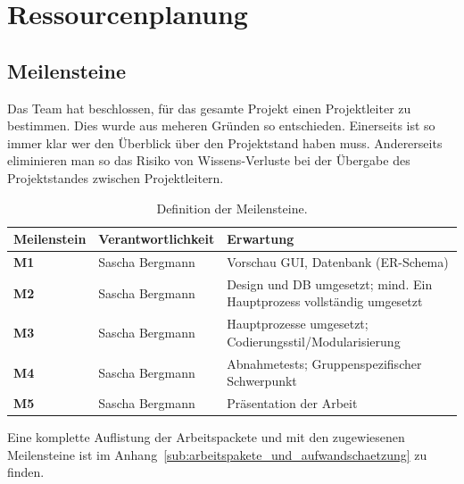 \section{Ressourcenplanung}
\subsection{Meilensteine}
Das Team hat beschlossen, für das gesamte Projekt einen Projektleiter zu bestimmen. Dies wurde aus meheren Gründen so entschieden.
Einerseits ist so immer klar wer den Überblick über den Projektstand haben muss. Andererseits eliminieren man so das Risiko von Wissens-Verluste bei der Übergabe des Projektstandes zwischen Projektleitern.\\

\begin{table}[H]
\centering
\begin{tabularx}{\textwidth-1cm}{|l|l|X|} \hline
\textbf{Meilenstein}	& \textbf{Verantwortlichkeit} &	\textbf{Erwartung} \\ \hline
\textbf{M1}	&Sascha Bergmann	&Vorschau GUI, Datenbank (ER-Schema) \\  \hline
\textbf{M2}	&Sascha Bergmann	&Design und DB umgesetzt; mind. Ein Hauptprozess vollständig umgesetzt \\ \hline
\textbf{M3}	&Sascha Bergmann	&Hauptprozesse umgesetzt; Codierungsstil/Modularisierung \\ \hline
\textbf{M4}	&Sascha Bergmann	&Abnahmetests; Gruppenspezifischer Schwerpunkt \\ \hline
\textbf{M5}	&Sascha Bergmann	&Präsentation der Arbeit \\ \hline
\end{tabularx}
\caption{Definition der Meilensteine.}
\end{table}

Eine komplette Auflistung der Arbeitspackete und mit den zugewiesenen Meilensteine ist im Anhang~\ref{sub:arbeitspakete_und_aufwandschaetzung} zu finden.  

